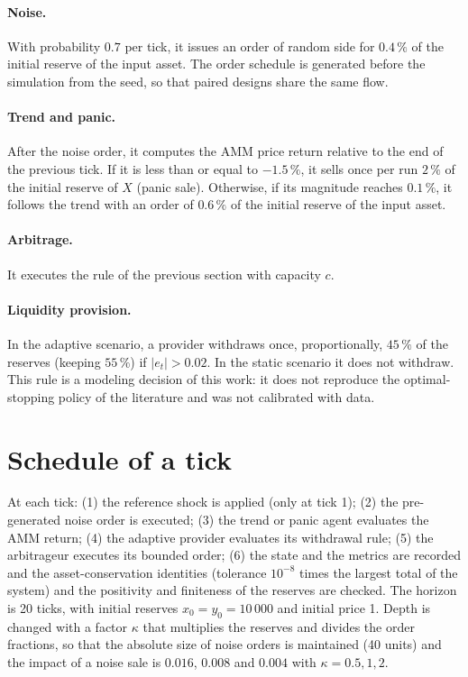 \paragraph{Noise.} With probability $0.7$ per tick, it issues an order of random side for $0.4\,\%$ of the initial reserve of the input asset. The order schedule is generated before the simulation from the seed, so that paired designs share the same flow.

\paragraph{Trend and panic.} After the noise order, it computes the AMM price return relative to the end of the previous tick. If it is less than or equal to $-1.5\,\%$, it sells once per run $2\,\%$ of the initial reserve of $X$ (panic sale). Otherwise, if its magnitude reaches $0.1\,\%$, it follows the trend with an order of $0.6\,\%$ of the initial reserve of the input asset.

\paragraph{Arbitrage.} It executes the rule of the previous section with capacity $c$.

\paragraph{Liquidity provision.} In the adaptive scenario, a provider withdraws once, proportionally, $45\,\%$ of the reserves (keeping $55\,\%$) if $|e_t|>0.02$. In the static scenario it does not withdraw. This rule is a modeling decision of this work: it does not reproduce the optimal-stopping policy of the literature \cite{bergault2025exit} and was not calibrated with data.

\section{Schedule of a tick}

At each tick: (1) the reference shock is applied (only at tick 1); (2) the pre-generated noise order is executed; (3) the trend or panic agent evaluates the AMM return; (4) the adaptive provider evaluates its withdrawal rule; (5) the arbitrageur executes its bounded order; (6) the state and the metrics are recorded and the asset-conservation identities (tolerance $10^{-8}$ times the largest total of the system) and the positivity and finiteness of the reserves are checked. The horizon is 20 ticks, with initial reserves $x_0=y_0=10\,000$ and initial price 1. Depth is changed with a factor $\kappa$ that multiplies the reserves and divides the order fractions, so that the absolute size of noise orders is maintained (40 units) and the impact of a noise sale is $0.016$, $0.008$ and $0.004$ with $\kappa=0.5,1,2$.

